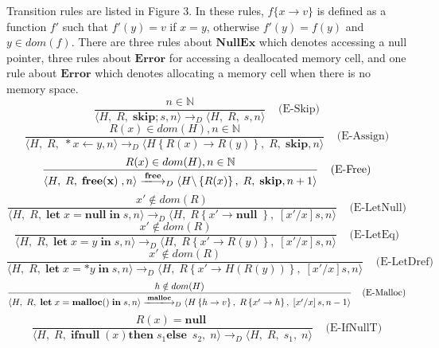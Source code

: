 \documentclass[english]{jssst_ppl} %
\newcommand\LET{\mathbf{let}\;}
\newcommand\FREE{\mathbf{free(x)}\;}
\newcommand\IN{\mathbf{in}\;}
\newcommand\SKIP{\mathbf{skip}}
\newcommand\Rtab{\; \; \; \;}
\newcommand\NULL{\mathbf{null}\;}
\newcommand\IFNULL{\mathbf{ifnull}\;}
\newcommand\THEN{\mathbf{then}\;}
\newcommand\ELSE{\mathbf{else}\;}
\newcommand\Lfc{\left\{}
\newcommand\Rfc{\right\}}
\newcommand\Lb{\left[}
\newcommand\Rb{\right]}
\newcommand\coma{,\;}
\newcommand\Malloc{\mathbf{malloc}}
\newcommand\Free{\mathbf{free}}
\newcommand\Cirx{(x)}
\theoremstyle{definition}
\begin{document}
Transition rules are listed in Figure 3. In these rules, $f\{x\to v\}$ is defined as a function $f'$ such that $f'(y) = v$ if $x = y$, otherwise $f'(y) = f(y)$ and $y \in dom(f)$. There are three rules about $\mathbf{NullEx}$ which denotes accessing a null pointer, three rules about $\mathbf{Error}$ for accessing a deallocated memory cell, and one rule about $\mathbf{Error}$ which denotes allocating a memory cell when there is no memory space.
$$
    \frac{n \in \mathbb{N}}
            {\langle H\coma R\coma  \SKIP;s , n \rangle
              \longrightarrow_{D}
                \langle H\coma R\coma   s , n \rangle }
     \Rtab \mbox{(E-Skip)}
$$
$$
     \frac{R(x) \in dom(H), n \in \mathbb{N}}
           {\langle H\coma R\coma  *x \leftarrow y , n \rangle
             \longrightarrow_{D}
             \langle H \Lfc R(x) \rightarrow R(y) \Rfc \coma R \coma   \SKIP , n  \rangle }
     \Rtab \mbox{(E-Assign)}
$$
$$
     \frac{R(x) \in dom(H) , n \in \mathbb{N}}
          {\langle H\coma R\coma  \FREE , n \rangle
            \xlongrightarrow{\Free}_{D}
            \langle H\backslash \Lfc R(x) \Rfc \coma R \coma   \SKIP , n+1  \rangle }
     \Rtab \mbox{(E-Free)}
$$
$$
     \frac{x' \notin dom(R)}
           {\langle H\coma R\coma  \LET x = \NULL \IN s , n \rangle
             \longrightarrow_{D}
             \langle H\coma R\Lfc x' \rightarrow \NULL \Rfc \coma   \Lb x'/x \Rb s , n  \rangle }
     \Rtab \mbox{(E-LetNull)}
$$
$$
     \frac{x' \notin dom(R)}
            {\langle H\coma R\coma \LET x = y \; \IN s , n \rangle
              \longrightarrow_{D}
              \langle H\coma R\Lfc x' \rightarrow R(y) \Rfc \coma   \Lb x'/x \Rb s , n  \rangle }
\Rtab \mbox{(E-LetEq)}
$$
$$
     \frac{x' \notin dom(R)}
            {\langle H\coma R\coma  \LET x = *y \; \IN s , n \rangle
              \longrightarrow_{D}
              \langle H\coma R\Lfc x' \rightarrow H(R(y)) \Rfc \coma   \Lb x'/x \Rb s , n  \rangle }
     \Rtab \mbox{(E-LetDref)}
$$
$$
     \frac{h \notin dom(H)}
            {\langle H\coma R\coma  \LET x = \Malloc() \; \IN s , n \rangle
              \xlongrightarrow{\Malloc}_{D}
              \langle H \Lfc h \rightarrow v\Rfc \coma R\Lfc x' \rightarrow h \Rfc \coma   \Lb x'/x \Rb s , n-1  \rangle }
\Rtab \mbox{(E-Malloc)}
$$
$$
    \frac{R(x) = \NULL}
           {\langle H \coma R \coma \IFNULL\Cirx   \THEN   s_{1} \ELSE\  s_{2} \coma  n \rangle
           \longrightarrow_{D}
           \langle H\coma R\coma s_{1} \coma n \rangle}
    \Rtab \mbox{(E-IfNullT)}
$$
\end{document}
